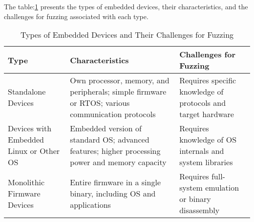 The table:\ref{tab:embedded_devices} presents the types of embedded devices, their characteristics,
and the challenges for fuzzing associated with each type\cite{yun2022fuzzing}.


\begin{table}[h!]
\centering
\begin{tabularx}{\textwidth}{@{}>{\raggedright\arraybackslash}p{3.5cm}>{\raggedright\arraybackslash}p{3.5cm}X@{}}
\toprule
\textbf{Type} & \textbf{Characteristics} & \textbf{Challenges for Fuzzing} \\
\midrule
Standalone Devices & Own processor, memory, and peripherals; simple firmware or RTOS; various communication protocols & Requires specific knowledge of protocols and target hardware \\
\addlinespace
Devices with Embedded Linux or Other OS & Embedded version of standard OS; advanced features; higher processing power and memory capacity & Requires knowledge of OS internals and system libraries \\
\addlinespace
Monolithic Firmware Devices & Entire firmware in a single binary, including OS and applications & Requires full-system emulation or binary disassembly \\
\bottomrule
\end{tabularx}
\caption{Types of Embedded Devices and Their Challenges for Fuzzing}
\label{tab:embedded_devices}
\end{table}
\clearpage

